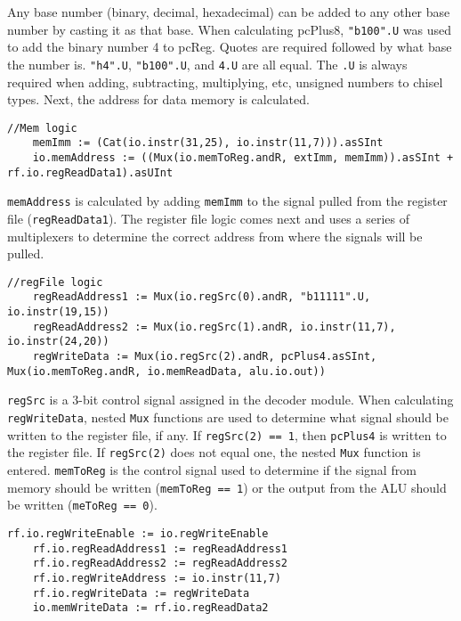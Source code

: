 \documentclass[12pt, letterpaper]{report}
\begin{document}
\noindent Any base number (binary, decimal, hexadecimal) can be added to any other base number by casting it as that base.
When calculating pcPlus8, \verb|"b100".U| was used to add the binary number 4 to pcReg. Quotes are required followed by what base the number is.
\verb|"h4".U|, \verb|"b100".U|, and \verb|4.U| are all equal.
The \verb|.U| is always required when adding, subtracting, multiplying, etc, unsigned numbers to chisel types. 
Next, the address for data memory is calculated. 


\begin{lstlisting}[style=scala]
    //Mem logic
    memImm := (Cat(io.instr(31,25), io.instr(11,7))).asSInt
    io.memAddress := ((Mux(io.memToReg.andR, extImm, memImm)).asSInt + rf.io.regReadData1).asUInt
\end{lstlisting}

\noindent \verb|memAddress| is calculated by adding \verb|memImm| to the signal pulled from the register file (\verb|regReadData1|).
The register file logic comes next and uses a series of multiplexers to determine the correct address from where the signals will be pulled.

\begin{lstlisting}[style=scala]
	//regFile logic
	regReadAddress1 := Mux(io.regSrc(0).andR, "b11111".U, io.instr(19,15))
	regReadAddress2 := Mux(io.regSrc(1).andR, io.instr(11,7), io.instr(24,20))
	regWriteData := Mux(io.regSrc(2).andR, pcPlus4.asSInt, Mux(io.memToReg.andR, io.memReadData, alu.io.out))
\end{lstlisting}

\verb|regSrc| is a 3-bit control signal assigned in the decoder module.
When calculating \verb|regWriteData|, nested \verb|Mux| functions are used to determine what signal should be written to the register file, if any.
If \verb|regSrc(2) == 1|, then \verb|pcPlus4| is written to the register file.
If \verb|regSrc(2)| does not equal one, the nested \verb|Mux| function is entered.
\verb|memToReg| is the control signal used to determine if the signal from memory should be written (\verb|memToReg == 1|) or the output from the ALU should be written (\verb|meToReg == 0|).
 

\begin{lstlisting}[style=scala]
    rf.io.regWriteEnable := io.regWriteEnable
    rf.io.regReadAddress1 := regReadAddress1
    rf.io.regReadAddress2 := regReadAddress2
    rf.io.regWriteAddress := io.instr(11,7)
    rf.io.regWriteData := regWriteData
    io.memWriteData := rf.io.regReadData2
\end{lstlisting}
\end{document}

